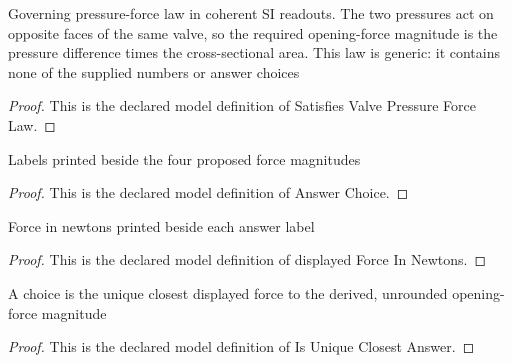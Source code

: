 \begin{definition}
  \label{def:physics:phyx-mini-0383:phyxminiproblems-problemphyxmini0383-satisfiesvalvepressureforcelaw}
  Governing pressure-force law in coherent SI readouts. The two pressures act on opposite faces of the same valve, so the required opening-force magnitude is the pressure difference times the cross-sectional area. This law is generic: it contains none of the supplied numbers or answer choices
\end{definition}
\begin{proof}
  This is the declared model definition of Satisfies Valve Pressure Force Law.
\end{proof}
\begin{definition}
  \label{def:physics:phyx-mini-0383:phyxminiproblems-problemphyxmini0383-answerchoice}
  Labels printed beside the four proposed force magnitudes
\end{definition}
\begin{proof}
  This is the declared model definition of Answer Choice.
\end{proof}
\begin{definition}
  \label{def:physics:phyx-mini-0383:phyxminiproblems-problemphyxmini0383-displayedforceinnewtons}
  Force in newtons printed beside each answer label
\end{definition}
\begin{proof}
  This is the declared model definition of displayed Force In Newtons.
\end{proof}
\begin{definition}
  \label{def:physics:phyx-mini-0383:phyxminiproblems-problemphyxmini0383-isuniqueclosestanswer}
  A choice is the unique closest displayed force to the derived, unrounded opening-force magnitude
\end{definition}
\begin{proof}
  This is the declared model definition of Is Unique Closest Answer.
\end{proof}
